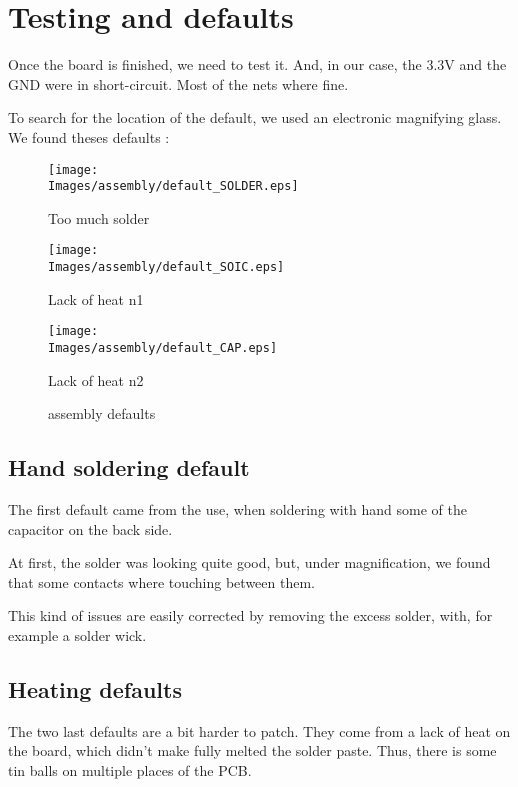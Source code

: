 \section{Testing and defaults}\label{sec:defaults}
Once the board is finished, we need to test it. And, in our case, the $3.3 \si{\volt}$
and the GND were in short-circuit. Most of the nets where fine.

To search for the location of the default, we used an electronic magnifying glass.
We found theses defaults :

\begin{figure}[!hbt]
    \centering
    \begin{minipage}[c]{0.32\textwidth}
        \centering
        \texttt{[image: \\Images/assembly/default\_SOLDER.eps]}
        \caption*{Too much solder}
    \end{minipage}%
    \hfill%
    \begin{minipage}[c]{0.32\textwidth}
        \centering
        \texttt{[image: \\Images/assembly/default\_SOIC.eps]}
        \caption*{Lack of heat n1}
    \end{minipage}%
    \hfill%
    \begin{minipage}[c]{0.32\textwidth}
        \centering
        \texttt{[image: \\Images/assembly/default\_CAP.eps]}
        \caption*{Lack of heat n2}
    \end{minipage}%
    \label{img:defaults}
    \caption{assembly defaults}
\end{figure}
\FloatBarrier

\subsection{Hand soldering default}
The first default came from the use, when soldering with hand some of the
capacitor on the back side.

At first, the solder was looking quite good, but, under magnification, we
found that some contacts where touching between them.

This kind of issues are easily corrected by removing the excess solder,
with, for example a solder wick.

\subsection{Heating defaults}
The two last defaults are a bit harder to patch. They come from a lack
of heat on the board, which didn't make fully melted the solder paste.
Thus, there is some tin balls on multiple places of the PCB.

